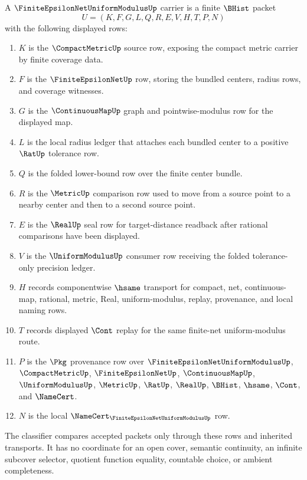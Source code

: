 \begin{definition}
\label{def:finite-epsilon-net-uniform-modulus-carrier}
A $\FiniteEpsilonNetUniformModulusUp$ carrier is a finite $\BHist$ packet
$$
U=(K,F,G,L,Q,R,E,V,H,T,P,N)
$$
with the following displayed rows:
\begin{enumerate}
\item $K$ is the $\CompactMetricUp$ source row, exposing the compact metric carrier by finite coverage data.
\item $F$ is the $\FiniteEpsilonNetUp$ row, storing the bundled centers, radius rows, and coverage witnesses.
\item $G$ is the $\ContinuousMapUp$ graph and pointwise-modulus row for the displayed map.
\item $L$ is the local radius ledger that attaches each bundled center to a positive $\RatUp$ tolerance row.
\item $Q$ is the folded lower-bound row over the finite center bundle.
\item $R$ is the $\MetricUp$ comparison row used to move from a source point to a nearby center and then to a second source point.
\item $E$ is the $\RealUp$ seal row for target-distance readback after rational comparisons have been displayed.
\item $V$ is the $\UniformModulusUp$ consumer row receiving the folded tolerance-only precision ledger.
\item $H$ records componentwise $\hsame$ transport for compact, net, continuous-map, rational, metric, Real, uniform-modulus, replay, provenance, and local naming rows.
\item $T$ records displayed $\Cont$ replay for the same finite-net uniform-modulus route.
\item $P$ is the $\Pkg$ provenance row over $\FiniteEpsilonNetUniformModulusUp$, $\CompactMetricUp$, $\FiniteEpsilonNetUp$, $\ContinuousMapUp$, $\UniformModulusUp$, $\MetricUp$, $\RatUp$, $\RealUp$, $\BHist$, $\hsame$, $\Cont$, and $\NameCert$.
\item $N$ is the local $\NameCert_{\FiniteEpsilonNetUniformModulusUp}$ row.
\end{enumerate}
The classifier compares accepted packets only through these rows and inherited transports. It has no coordinate for an open cover, semantic continuity, an infinite subcover selector, quotient function equality, countable choice, or ambient completeness.
\end{definition}

